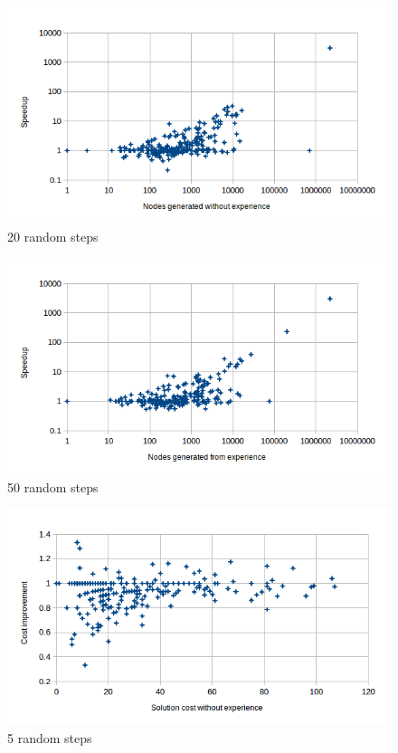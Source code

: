 \documentclass[letterpaper]{article}
\begin{document}
\begin{figure}
	\begin{center}
	\includegraphics[scale=0.5]{Speedup_100_20.png}
	\end{center}
	\caption{20 random steps}
	 \label{fig:s_100_20}
\end{figure}

\begin{figure}
	\begin{center}
	\includegraphics[scale=0.5]{Speedup_100_50.png}
	\end{center}
	\caption{50 random steps}
	 \label{fig:s_100_50}
\end{figure}

\begin{figure}
	\begin{center}
	\includegraphics[scale=0.5]{Cost_100_5.png}
	\end{center}
	\caption{5 random steps}
	 \label{fig:c_100_5}
\end{figure}
\end{document}
